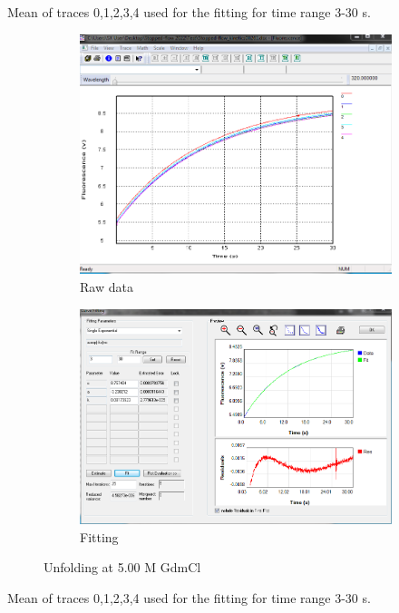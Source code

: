 \documentclass[a4paper,english,12pt,bibliography=totoc]{scrreprt}
\begin{document}
Mean of traces 0,1,2,3,4 used for the fitting for time range 3-30 s.
\begin{figure}[H]
    \centering
    \begin{subfigure}[b]{0.45\textwidth}
        \centering
        \includegraphics[width=\textwidth]{Images/G8/uf7_raw.PNG}
        \caption{Raw data }
        \label{fig:sub1}
    \end{subfigure}
    \hspace{0cm} %
    \begin{subfigure}[b]{0.45\textwidth}
        \centering
        \includegraphics[width=\textwidth]{Images/G8/uf7_fitting.PNG}
        \caption{Fitting}
        \label{fig:sub2}
    \end{subfigure}
    \caption{Unfolding at 5.00 M GdmCl }
    \label{fig:main}
\end{figure}
Mean of traces 0,1,2,3,4 used for the fitting for time range 3-30 s.
\end{document}
